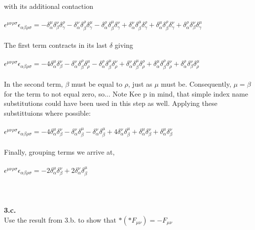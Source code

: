 \documentclass[prb,preprint]
{revtex4-1}
\newcommand{\PRLsep}{\noindent\makebox[\linewidth]{\resizebox{0.8888\linewidth}{2pt}{$\bullet$}}\bigskip}
\begin{document}
\\
\\
with its additional contaction
\\
\\
$\epsilon^{\mu\nu\rho\sigma}\epsilon_{\alpha\beta\rho\sigma} = -\delta^\mu_\alpha \delta^\nu_\beta \delta^\rho_\gamma - \delta^\nu_\alpha \delta^\rho_\beta \delta^\mu_\gamma - \delta^\rho_\alpha \delta^\mu_\beta \delta^\nu_\gamma + \delta^\nu_\alpha \delta^\mu_\beta \delta^\rho_\gamma + \delta^\mu_\alpha \delta^\rho_\beta \delta^\nu_\gamma + \delta^\rho_\alpha \delta^\nu_\beta \delta^\mu_\gamma$
\\
\\
The first term contracts in its last $\delta$ giving 
\\
\\
$\epsilon^{\mu\nu\rho\sigma}\epsilon_{\alpha\beta\rho\sigma} = -4\delta^\mu_\alpha \delta^\nu_\beta - \delta^\nu_\alpha \delta^\rho_\beta \delta^\mu_\rho - \delta^\rho_\alpha \delta^\mu_\beta \delta^\nu_\rho + \delta^\nu_\alpha \delta^\mu_\beta \delta^\rho_\rho + \delta^\mu_\alpha \delta^\rho_\beta \delta^\nu_\rho + \delta^\rho_\alpha \delta^\nu_\beta \delta^\mu_\rho$
\\
\\
In the second term, $\beta$ must be equal to $\rho$, just as $\mu$ must be.  Consequently, $\mu = \beta$ for the term to not equal zero, so...  Note Kee p in mind, that simple index name substitutions could have been used in this step as well.  Applying these substittuions where possible:
\\
\\
$\epsilon^{\mu\nu\rho\sigma}\epsilon_{\alpha\beta\rho\sigma} = -4\delta^\mu_\alpha \delta^\nu_\beta - \delta^\nu_\alpha \delta^\mu_\beta - \delta^\nu_\alpha \delta^\mu_\beta + 4\delta^\nu_\alpha \delta^\mu_\beta + \delta^\mu_\alpha \delta^\nu_\beta + \delta^\mu_\alpha \delta^\nu_\beta$
\\
\\
Finally, grouping terms we arrive at,
\\
\\
$\epsilon^{\mu\nu\rho\sigma}\epsilon_{\alpha\beta\rho\sigma} = -2\delta^\mu_\alpha \delta^\nu_\beta + 2\delta^\nu_\alpha \delta^\mu_\beta$
\\
\\
\PRLsep
\\
\\
\newpage
\textbf{3.c.}
\\
Use the result from 3.b. to show that $*\left(*F_{\mu\nu}\right) = -F_{\mu\nu}$
\end{document}
